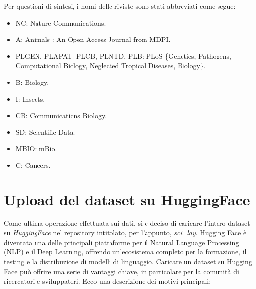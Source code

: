 \documentclass[12pt,a4paper,twoside,openright]{book}
\begin{document}
Per questioni di sintesi, i nomi delle riviste sono stati abbreviati come segue:
\begin{itemize}
    \item NC: Nature Communications.
    \item A: Animals : An Open Access Journal from MDPI.
    \item PLGEN, PLAPAT, PLCB, PLNTD, PLB: PLoS \{Genetics, Pathogens, Computational Biology, Neglected Tropical Diseases, Biology\}.
    \item B: Biology.
    \item I: Insects.
    \item CB: Communications Biology.
    \item SD: Scientific Data.
    \item MBIO: mBio.
    \item C: Cancers.
\end{itemize}


\section{Upload del dataset su HuggingFace}
Come ultima operazione effettuata sui dati, si è deciso di caricare l'intero dataset su \href{https://huggingface.co/}{\emph{HuggingFace}} nel repository intitolato, per l'appunto, \href{https://huggingface.co/datasets/paniniDot/sci_lay}{\emph{sci\_lay}}. 
Hugging Face è diventata una delle principali piattaforme per il Natural Language Processing (NLP) e il Deep Learning, offrendo un'ecosistema completo per la formazione, il testing e la distribuzione di modelli di linguaggio. Caricare un dataset su Hugging Face può offrire una serie di vantaggi chiave, in particolare per la comunità di ricercatori e sviluppatori. Ecco una descrizione dei motivi principali:
\end{document}
